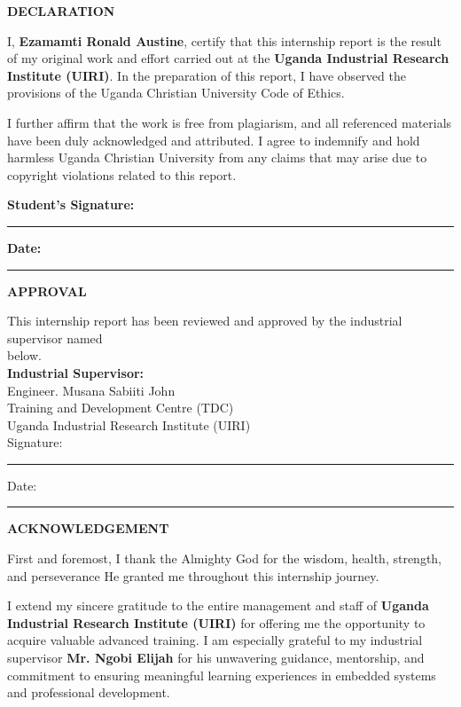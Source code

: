 \documentclass[12pt,a4paper]{report}
\begin{document}
{\fontsize{14}{16.8}\selectfont\bfseries\centering DECLARATION\par}
\vspace{10pt}
\vspace{5pt}
\noindent I, \textbf{Ezamamti Ronald Austine}, certify that this internship report is the result of my original work and effort carried out at the \textbf{Uganda Industrial Research Institute (UIRI)}. In the preparation of this report, I have observed the provisions of the Uganda Christian University Code of Ethics.

\noindent I further affirm that the work is free from plagiarism, and all referenced materials have been duly acknowledged and attributed. I agree to indemnify and hold harmless Uganda Christian University from any claims that may arise due to copyright violations related to this report.

\vspace{2cm}
\noindent \textbf{Student's Signature:} \rule{6cm}{0.2pt} \hfill \textbf{Date:} \rule{3cm}{0.2pt}

\newpage
{\fontsize{14}{16.8}\selectfont\bfseries\centering APPROVAL\par}
\vspace{10pt}

\noindent This internship report has been reviewed and approved by the industrial supervisor named \\below.\\[1.2cm]

\noindent \textbf{Industrial Supervisor:} \\
Engineer. Musana Sabiiti John \\
Training and Development Centre (TDC) \\Uganda Industrial Research Institute (UIRI)\\[0.8cm]

\noindent Signature: \rule{5cm}{0.2pt} \hfill Date: \rule{3cm}{0.2pt}

\newpage
{\fontsize{14}{16.8}\selectfont\bfseries\centering ACKNOWLEDGEMENT\par}
\vspace{10pt}
\noindent First and foremost, I thank the Almighty God for the wisdom, health, strength, and perseverance He granted me throughout this internship journey.

\noindent I extend my sincere gratitude to the entire management and staff of \textbf{Uganda Industrial Research Institute (UIRI)} for offering me the opportunity to acquire valuable advanced training. I am especially grateful to my industrial supervisor \textbf{Mr. Ngobi Elijah} for his unwavering guidance, mentorship, and commitment to ensuring meaningful learning experiences in embedded systems and professional development.
\end{document}
